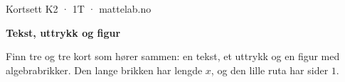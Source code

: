 \documentclass[11pt,a4paper]{article}
\begin{document}
\begin{minipage}[t]{0.8\linewidth}\vspace{0pt}
{\sffamily\small\color{dempet}Kortsett K2 · 1T · mattelab.no}\par\vspace{0.25em}
{\fontsize{20}{24}\selectfont\bfseries Tekst, uttrykk og figur}\par\vspace{0.5em}
Finn tre og tre kort som hører sammen: en tekst, et uttrykk og en figur med algebrabrikker. Den lange brikken har lengde $x$, og den lille ruta har sider $1$.\par{}
\end{minipage}\hfill
\begin{minipage}[t]{0.15\linewidth}\vspace{0pt}\raggedleft
{}
\end{minipage}\par\vspace{0.8em}
\end{document}
